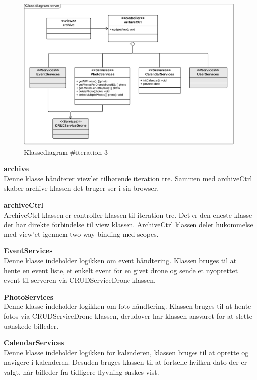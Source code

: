 \begin{figure}[H]
	\centering
	\includegraphics[width=1\textwidth]{Billeder/klasse_diagrammer/classdiagram_iteration3_server.png}
	\vspace{-0.5cm}
	\caption{Klassediagram \#iteration 3}
	\label{fig:classDiagram_iteration3}
\end{figure}

\textbf{archive}\\
Denne klasse håndterer view'et tilhørende iteration tre. Sammen med archiveCtrl skaber archive klassen det bruger ser i sin browser.

\textbf{archiveCtrl}\\
ArchiveCtrl klassen er controller klassen til iteration tre. Det er den eneste klasse der har direkte forbindelse til view klassen. ArchiveCtrl klassen deler hukommelse med view'et igennem two-way-binding med scopes.

\textbf{EventServices}\\
Denne klasse indeholder logikken om event håndtering. Klassen bruges til at hente en event liste, et enkelt event for en givet drone og sende et nyoprettet event til serveren via CRUDServiceDrone klassen.

\textbf{PhotoServices}\\
Denne klasse indeholder logikken om foto håndtering. Klassen bruges til at hente fotos via CRUDServiceDrone klassen, derudover har klassen ansvaret for at slette uønskede billeder.
\newpage

\textbf{CalendarServices}\\
Denne klasse indeholder logikken for kalenderen, klassen bruges til at oprette og navigere i kalenderen. Desuden bruges klassen til at fortælle hvilken dato der er valgt, når  billeder fra tidligere flyvning ønskes vist.

